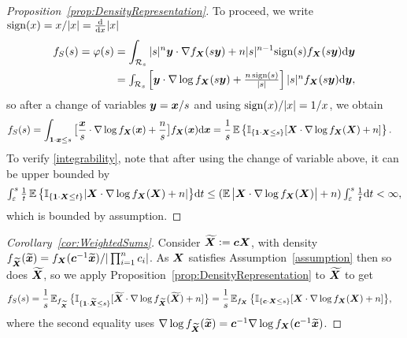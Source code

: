 \begin{subappendices}
\begin{proof}[Proposition~\ref{prop:DensityRepresentation}]
To proceed, we write $\mathrm{sign}(x)= x / |x| = \frac{\mathrm{d}}{\mathrm{d} x} |x|$
\begin{align*}
f_S(s)=\varphi(s) &=\int_{\mathcal{R}_s} |s|^n \boldsymbol{y} \cdot \nabla f_{\boldsymbol{X}}(s \boldsymbol{y}) + n |s|^{n-1} \mathrm{sign}(s) f_{\boldsymbol{X}}(s \boldsymbol{y})  \mathrm{d} \boldsymbol{y} \\
&=\textstyle\int_{\mathcal{R}_s} \left[ \boldsymbol{y} \cdot \nabla \log f_{\boldsymbol{X}}(s \boldsymbol{y}) + \frac{n \, \mathrm{sign}(s)}{|s|} \right] |s|^{n} f_{\boldsymbol{X}}(s \boldsymbol{y})  \mathrm{d} \boldsymbol{y} ,
\end{align*}
so after a change of variables $\boldsymbol{y} = \boldsymbol{x} / s$ and using $\mathrm{sign}(x)/|x|=1/x$, we obtain
\begin{align*}
f_S(s)
&= \int_{\boldsymbol{1} \cdot \boldsymbol{x} \le s } \big[ \frac{\boldsymbol{x}}{s} \cdot \nabla \log f_{\boldsymbol{X}}(\boldsymbol{x}) + \frac{n}{s} \big] f_{\boldsymbol{X}}(\boldsymbol{x})  \mathrm{d} \boldsymbol{x}
= \frac{1}{s} \operatorname{{\mathbb E}} \big\{ \mathbb{I}_{\{ \boldsymbol{1} \cdot \boldsymbol{X} \le s  \}} [ \boldsymbol{X} \cdot \nabla \log f_{\boldsymbol{X}}(\boldsymbol{X}) + n ] \big\} \,.
\end{align*}
To verify \eqref{integrability}, note that after using the change of variable above, it can be upper bounded by
\[
\textstyle\int_\varepsilon^s\frac{1}{t} \operatorname{{\mathbb E}} \big\{ \mathbb{I}_{\{ \boldsymbol{1} \cdot \boldsymbol{X} \le t  \}}| \boldsymbol{X} \cdot \nabla \log f_{\boldsymbol{X}}(\boldsymbol{X}) + n |\big\} \mathrm{d} t\leq (\operatorname{{\mathbb E}} \big| \boldsymbol{X} \cdot \nabla \log f_{\boldsymbol{X}}(\boldsymbol{X})\big | + n) \int_\varepsilon^s\frac{1}{t}\mathrm{d} t<\infty,
\]
which is bounded by assumption. 
\end{proof}

\begin{proof}[Corollary~\ref{cor:WeightedSums}]
Consider $\widetilde{\boldsymbol{X}} := \boldsymbol{c} \boldsymbol{X}$, with density
$f_{\widetilde{\boldsymbol{X}}}(\widetilde{\boldsymbol{x}}) = f_{\boldsymbol{X}}(\boldsymbol{c}^{-1} \widetilde{\boldsymbol{x}} ) / | \prod_{i=1}^n c_i |$.
As $\boldsymbol{X}$ satisfies Assumption~\ref{assumption} then so does $\widetilde{\boldsymbol{X}}$, so we apply Proposition~\ref{prop:DensityRepresentation} to $\widetilde{\boldsymbol{X}}$ to get
\begin{align*}
f_S(s) 
&= \frac{1}{s} \operatorname{{\mathbb E}}_{f_{\widetilde{\boldsymbol{X}}}}\big\{ \mathbb{I}_{\{\boldsymbol{1} \cdot \widetilde{\boldsymbol{X}} \le s \}} [ \widetilde{\boldsymbol{X}} \cdot \nabla \log f_{\widetilde{\boldsymbol{X}}}(\widetilde{\boldsymbol{X}}) + n ] \big\} = \frac{1}{s} \operatorname{{\mathbb E}}_{f_{\boldsymbol{X}}}\big\{ \mathbb{I}_{\{\boldsymbol{c} \cdot \boldsymbol{X} \le s \}} [ \boldsymbol{X} \cdot \nabla \log f_{\boldsymbol{X}}(\boldsymbol{X}) + n ] \big\}, 
\end{align*}
where the second equality uses
$\nabla \log f_{\widetilde{\boldsymbol{X}}}(\widetilde{\boldsymbol{x}}) 
= \boldsymbol{c}^{-1} \nabla \log f_{\boldsymbol{X}}(\boldsymbol{c}^{-1} \widetilde{\boldsymbol{x}} )  $.
\end{proof}


\end{subappendices}
